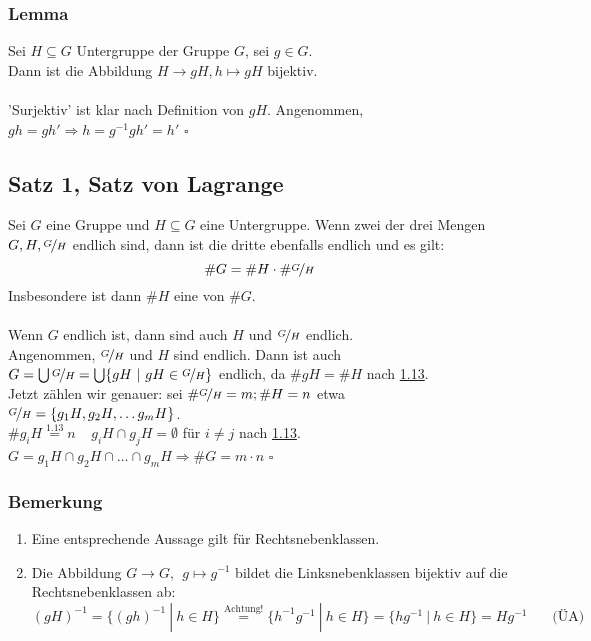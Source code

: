 \subsubsection*{Lemma}
Sei $H\subseteq G$ Untergruppe der Gruppe $G$, sei $g \in G$.\\
Dann ist die Abbildung $H \to gH, h \mapsto gH$ bijektiv.\\

\\
'Surjektiv' ist klar nach Definition von $gH$. Angenommen, $gh=gh' \Rightarrow h=g^{-1}gh'=h'$
\hfill $\square$

\subsection{Satz 1, Satz von Lagrange}
\label{sub:satz_von_lagrange}
Sei $G$ eine Gruppe und $H\subseteq G$ eine Untergruppe. Wenn zwei der drei Mengen $G,H,\nicefrac{G}{H}$ endlich sind, dann ist die dritte ebenfalls endlich und es gilt:\\
\[\#G=\#H \cdot \#\nicefrac{G}{H} \]
Insbesondere ist dann $\#H$ eine  von $\#G$.\\
\vfill
{}\\
Wenn $G$ endlich ist, dann sind auch $H$ und $\nicefrac{G}{H}$ endlich.\\
Angenommen, $\nicefrac{G}{H}$ und $H$ sind endlich. Dann ist auch $G= \bigcup \nicefrac{G}{H}=\bigcup\{gH~|~gH\in \nicefrac{G}{H} \}$ endlich, da $\#gH=\#H$ nach \hyperref[sub:nebenklassen]{1.13}.\\
Jetzt zählen wir genauer: sei $\#\nicefrac{G}{H}=m; \#H=n$ etwa $\nicefrac{G}{H}=\{g_1H,g_2H,\dots g_mH \}$.\\
$\#g_iH\stackrel{\hyperref[sub:nebenklassen]{1.13}}{=}n~~~~~g_iH\cap g_jH=\emptyset$ für $i\not=j$ nach \hyperref[sub:nebenklassen]{1.13}.\\
$G=g_1H\cap g_2H\cap \dots \cap g_mH \Rightarrow \#G=m\cdot n$
\hfill $\square$

\subsubsection*{Bemerkung}
\begin{enumerate}[(1)]
	\item Eine entsprechende Aussage gilt für Rechtsnebenklassen.
	\item Die Abbildung $G \to G,~~g\mapsto g^{-1}$ bildet die Linksnebenklassen bijektiv auf die Rechtsnebenklassen ab:
	\[
	(gH)^{-1}=\{(gh)^{-1}~|~h \in H \} \stackrel{\text{Achtung!}}{=}\{h^{-1}g^{-1}~|~h \in H \}=\{hg^{-1}~|~h\in H \}=Hg^{-1}~~~~~~~~\text{(ÜA)}
	\]
\end{enumerate}

